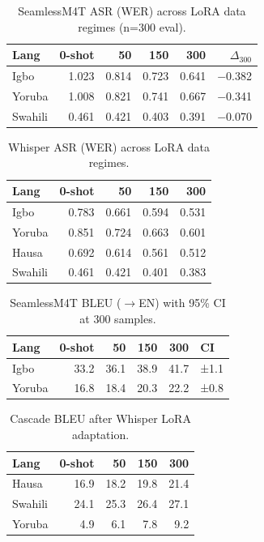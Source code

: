 
\begin{table}[t]
\centering
\small
\caption{SeamlessM4T ASR (WER) across LoRA data regimes (n=300 eval).}
\label{tab:p2_sm_wer}
\begin{tabular}{lrrrrr}
\toprule
\textbf{Lang} & \textbf{0-shot} & \textbf{50} & \textbf{150} & \textbf{300} & $\Delta_{300}$ \\
\midrule
Igbo    & 1.023 & 0.814 & 0.723 & 0.641 & $-$0.382 \\
Yoruba  & 1.008 & 0.821 & 0.741 & 0.667 & $-$0.341 \\
Swahili & 0.461 & 0.421 & 0.403 & 0.391 & $-$0.070 \\
\bottomrule
\end{tabular}
\end{table}

\begin{table}[t]
\centering
\small
\caption{Whisper ASR (WER) across LoRA data regimes.}
\label{tab:p2_whisper_wer}
\begin{tabular}{lrrrr}
\toprule
\textbf{Lang} & \textbf{0-shot} & \textbf{50} & \textbf{150} & \textbf{300} \\
\midrule
Igbo    & 0.783 & 0.661 & 0.594 & 0.531 \\
Yoruba  & 0.851 & 0.724 & 0.663 & 0.601 \\
Hausa   & 0.692 & 0.614 & 0.561 & 0.512 \\
Swahili & 0.461 & 0.421 & 0.401 & 0.383 \\
\bottomrule
\end{tabular}
\end{table}

\begin{table}[t]
\centering
\small
\caption{SeamlessM4T BLEU ($\to$EN) with 95\% CI at 300 samples.}
\label{tab:p2_sm_bleu}
\begin{tabular}{lrrrrl}
\toprule
\textbf{Lang} & \textbf{0-shot} & \textbf{50} & \textbf{150} & \textbf{300} & \textbf{CI} \\
\midrule
Igbo   & 33.2 & 36.1 & 38.9 & 41.7 & ±1.1 \\
Yoruba & 16.8 & 18.4 & 20.3 & 22.2 & ±0.8 \\
\bottomrule
\end{tabular}
\end{table}

\begin{table}[t]
\centering
\small
\caption{Cascade BLEU after Whisper LoRA adaptation.}
\label{tab:p2_cascade_bleu}
\begin{tabular}{lrrrr}
\toprule
\textbf{Lang} & \textbf{0-shot} & \textbf{50} & \textbf{150} & \textbf{300} \\
\midrule
Hausa   & 16.9 & 18.2 & 19.8 & 21.4 \\
Swahili & 24.1 & 25.3 & 26.4 & 27.1 \\
Yoruba  &  4.9 &  6.1 &  7.8 &  9.2 \\
\bottomrule
\end{tabular}
\end{table}
